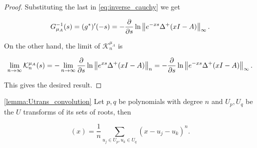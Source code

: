 \begin{proof}
    Substituting the last in \eqref{eq:inverse_cauchy} we get 

    \begin{equation*}
        G_{\mu_A}^{-1}(s) = (g^*)'(-s) = -\frac{\partial}{\partial s} \ln \left\lVert e^{-xs} \Delta^+(xI - A) \right\rVert_\infty.
    \end{equation*}

    On the other hand, the limit of $\mathcal K_n^{\mu_A}$ is 

    \begin{equation*}
        \lim_{n\to\infty}  \mathcal K_n^{\mu_A}(s) = - \lim_{n\to\infty} \frac{\partial}{\partial s} \ln \left\lVert e^{xs}\Delta^+(xI - A) \right\rVert_n =  -\frac{\partial}{\partial s} \ln \left\lVert e^{-xs} \Delta^+(xI - A) \right\rVert_\infty.
    \end{equation*}

    This gives the desired result.
\end{proof}







\begin{lemma} \ref{lemma:Utrans_convolution}
    Let $p,q$ be polynomials with degree $n$ and $U_p,U_q$ be the $U$ transforms of its sets of roots, then

    \begin{equation*}
        [p \boxplus_n q](x) = \frac1n \sum_{u_j \in U_p, u_k \in U_q} (x - u_j -u_k)^n.
    \end{equation*}
\end{lemma}


